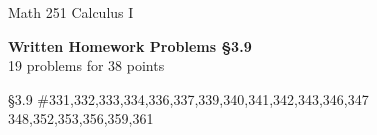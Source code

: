 \documentclass[11pt]{report}
\theoremstyle{plain}
\begin{document}
\hfill Math 251 Calculus I
\begin{center}
\Large{\textbf{Written Homework Problems \S 3.9}} \\
19 problems for 38 points\\
\end{center}

\begin{description}
\item{\S 3.9} \#331,332,333,334,336,337,339,340,341,342,343,346,347 348,352,353,356,359,361\\


\end{description}
\end{document}
